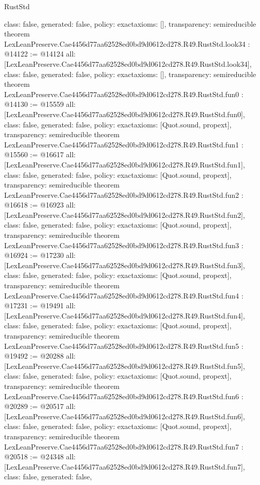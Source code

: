 \begin{lexlean}{RustStd}
\begin{coremodule}
{  class: false,
  generated: false,
  policy: exact{axioms: []},
  transparency: semireducible
}
theorem LexLeanPreserve.Cae4456d77aa62528ed0bd9d0612cd278.R49.RustStd.look34 : @14122 := @14124 {
  all: [LexLeanPreserve.Cae4456d77aa62528ed0bd9d0612cd278.R49.RustStd.look34],
  class: false,
  generated: false,
  policy: exact{axioms: []},
  transparency: semireducible
}
theorem LexLeanPreserve.Cae4456d77aa62528ed0bd9d0612cd278.R49.RustStd.fun0 : @14130 := @15559 {
  all: [LexLeanPreserve.Cae4456d77aa62528ed0bd9d0612cd278.R49.RustStd.fun0],
  class: false,
  generated: false,
  policy: exact{axioms: [Quot.sound, propext]},
  transparency: semireducible
}
theorem LexLeanPreserve.Cae4456d77aa62528ed0bd9d0612cd278.R49.RustStd.fun1 : @15560 := @16617 {
  all: [LexLeanPreserve.Cae4456d77aa62528ed0bd9d0612cd278.R49.RustStd.fun1],
  class: false,
  generated: false,
  policy: exact{axioms: [Quot.sound, propext]},
  transparency: semireducible
}
theorem LexLeanPreserve.Cae4456d77aa62528ed0bd9d0612cd278.R49.RustStd.fun2 : @16618 := @16923 {
  all: [LexLeanPreserve.Cae4456d77aa62528ed0bd9d0612cd278.R49.RustStd.fun2],
  class: false,
  generated: false,
  policy: exact{axioms: [Quot.sound, propext]},
  transparency: semireducible
}
theorem LexLeanPreserve.Cae4456d77aa62528ed0bd9d0612cd278.R49.RustStd.fun3 : @16924 := @17230 {
  all: [LexLeanPreserve.Cae4456d77aa62528ed0bd9d0612cd278.R49.RustStd.fun3],
  class: false,
  generated: false,
  policy: exact{axioms: [Quot.sound, propext]},
  transparency: semireducible
}
theorem LexLeanPreserve.Cae4456d77aa62528ed0bd9d0612cd278.R49.RustStd.fun4 : @17231 := @19491 {
  all: [LexLeanPreserve.Cae4456d77aa62528ed0bd9d0612cd278.R49.RustStd.fun4],
  class: false,
  generated: false,
  policy: exact{axioms: [Quot.sound, propext]},
  transparency: semireducible
}
theorem LexLeanPreserve.Cae4456d77aa62528ed0bd9d0612cd278.R49.RustStd.fun5 : @19492 := @20288 {
  all: [LexLeanPreserve.Cae4456d77aa62528ed0bd9d0612cd278.R49.RustStd.fun5],
  class: false,
  generated: false,
  policy: exact{axioms: [Quot.sound, propext]},
  transparency: semireducible
}
theorem LexLeanPreserve.Cae4456d77aa62528ed0bd9d0612cd278.R49.RustStd.fun6 : @20289 := @20517 {
  all: [LexLeanPreserve.Cae4456d77aa62528ed0bd9d0612cd278.R49.RustStd.fun6],
  class: false,
  generated: false,
  policy: exact{axioms: [Quot.sound, propext]},
  transparency: semireducible
}
theorem LexLeanPreserve.Cae4456d77aa62528ed0bd9d0612cd278.R49.RustStd.fun7 : @20518 := @24348 {
  all: [LexLeanPreserve.Cae4456d77aa62528ed0bd9d0612cd278.R49.RustStd.fun7],
  class: false,
  generated: false,
}
\end{coremodule}
\end{lexlean}
